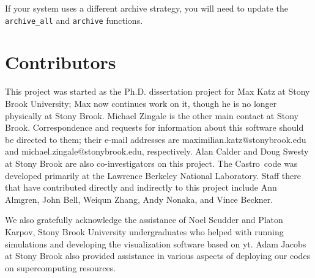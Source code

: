 \documentclass[12pt]{book}
\newcommand{\castro}{{\sf Castro}}
\begin{document}
If your system uses a different archive strategy, you will need to update the \texttt{archive\_all} 
and \texttt{archive} functions.

\chapter{Contributors}
\label{sec:contributors}

This project was started as the Ph.D. dissertation project for Max Katz at Stony Brook University;
Max now continues work on it, though he is no longer physically at Stony Brook.
Michael Zingale is the other main contact at Stony Brook. Correspondence and requests for information 
about this software should be directed to them; their e-mail addresses are maximilian.katz@stonybrook.edu
and michael.zingale@stonybrook.edu, respectively. Alan Calder and Doug Swesty at Stony Brook are 
also co-investigators on this project. The \castro\ code was developed primarily at the 
Lawrence Berkeley National Laboratory. Staff there that have contributed directly and 
indirectly to this project include Ann Almgren, John Bell, Weiqun Zhang, Andy Nonaka, and Vince Beckner.

We also gratefully acknowledge the assistance of Noel Scudder and Platon Karpov, 
Stony Brook University undergraduates who helped with running simulations and 
developing the visualization software based on yt. Adam Jacobs at Stony Brook also provided 
assistance in various aspects of deploying our codes on supercomputing resources.

\backmatter



\end{document}

